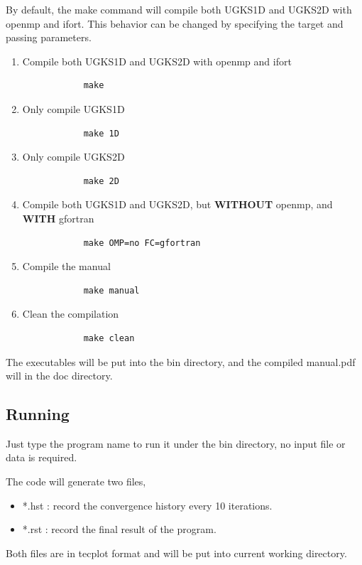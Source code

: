\documentclass[a4paper]{book}
\begin{document}
By default, the make command will compile both UGKS1D and UGKS2D with openmp and ifort. This behavior can be changed by specifying the target and passing parameters.

\begin{enumerate}
    \item Compile both UGKS1D and UGKS2D with openmp and ifort  
        \begin{verbatim}
            make
        \end{verbatim}
    \item Only compile UGKS1D
        \begin{verbatim}
            make 1D
        \end{verbatim}
    \item Only compile UGKS2D
        \begin{verbatim}
            make 2D
        \end{verbatim}
    \item Compile both UGKS1D and UGKS2D, but \textbf{WITHOUT} openmp, and \textbf{WITH} gfortran
        \begin{verbatim}
            make OMP=no FC=gfortran
        \end{verbatim}
    \item Compile the manual
        \begin{verbatim}
            make manual
        \end{verbatim}
    \item Clean the compilation
        \begin{verbatim}
            make clean
        \end{verbatim}
\end{enumerate}

The executables will be put into the bin directory, and the compiled manual.pdf will in the doc directory.

\subsection{Running}
Just type the program name to run it under the bin directory, no input file or data is required. 

The code will generate two files,
\begin{itemize}
    \item *.hst : record the convergence history every 10 iterations.
    \item *.rst : record the final result of the program.
\end{itemize}
Both files are in tecplot format and will be put into current working directory.
\end{document}
